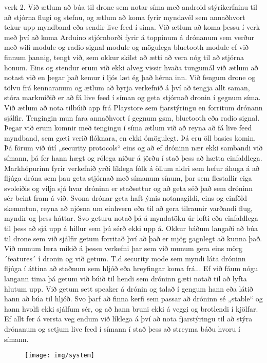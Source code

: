 verk 2.
Við ætlum að búa til drone sem notar síma með android stýrikerfninu til að stjórna flugi og stefnu, og ætlum að koma fyrir myndavél sem annaðhvort tekur upp myndband eða sendir live feed í síma.
Við ætlum að koma þessu í verk með því að koma Arduino stjórnborði fyrir á toppinum á drónanum sem verður með wifi module og radio signal module  og mögulega bluetooth module ef við finnum þannig, tengt við, sem okkur skilst að ætti að vera nóg til að stjórna honum. Eins og stendur erum við ekki alveg vissir hvaða tungumál við ætlum að notast við en þegar það kemur í ljós læt ég það hérna inn. 
Við fengum drone og tölvu frá kennaranum og ætlum að byrja verkefnið á því að tengja allt saman, stóra markmiðið er að fá live feed í síman og geta stjórnað dronin í gegnum síma. Við ætlum að nota tilbúið app frá Playstore sem fjarstýringu en forritum drónann sjálfir. Tengingin mun fara annaðhvort í gegnum gsm, bluetooth eða radio signal. Þegar við erum komnir með tengingu í síma ætlum við að reyna að fá live feed myndband, sem gæti verið flóknara, en ekki ómögulegt. Þá eru öll basics komin. Þá förum við útí „security protocols“ eins og að ef dróninn nær ekki sambandi við símann, þá fer hann hægt og rólega niður á jörðu í stað þess að hætta einfaldlega.
Markhópurinn fyrir verkefnið yrði líklega fólk á öllum aldri sem hefur áhuga á að fljúga dróna sem þau geta stjórnað með símanum sínum, þar sem flestallir eiga svoleiðis og vilja sjá hvar dróninn er staðsettur og að geta séð það sem dróninn sér beint fram á við. 
Svona drónar geta haft ýmis notanagildi, eins og einföld skemmtun, reyna að njósna um einhvern eða til að gera tilraunir varðandi flug, myndir og þess háttar. Svo geturu notað þá á myndatöku úr lofti eða einfaldlega til þess að sjá upp á hillur sem þú sérð ekki upp á.
Okkur báðum langaði að búa til drone sem við sjálfir getum forritað því að það er mjög gagnlegt að kunna það. Við munum læra mikið á þessu verkefni þar sem við munum gera eins mörg ´features´ í dronin og við getum. T.d security mode sem myndi láta dróninn fljúga í áttina að staðnum sem hljóð eða hreyfingar koma frá... Ef við fáum nógu langann tima þá getum við búið til hendi sem dróninn gæti notað til að lyfta hlutum upp. Við getum sett speaker á drónin og talað í gengum hann eða látið hann að búa til hljóð. Svo þarf að finna kerfi sem passar að dróninn sé „stable“ og hann hvolfi ekki sjálfum sér, og að hann bruni ekki á veggi og brotlendi í kjölfar. 
Ef allt fer á versta veg endum við líklega á því að nota fjarstýringu til að stýra drónanum og setjum live feed í símann í stað þess að streyma báðu hvoru í símann.

\begin{figure}[h]
\texttt{[image: img/system]}
\end{figure}
